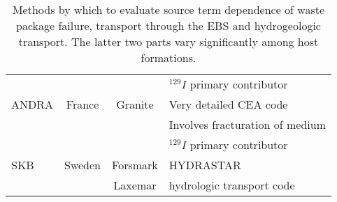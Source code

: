 \begin{table}
{\begin{tabular}{|l|c|c|l|}
                                                        &             &                           & $^{129}I$ primary contributor \\
      ANDRA \cite{andra_granite:_2005}                  & France      & Granite                   &  Very detailed CEA code  \\
                                                        &             &                           &  Involves fracturation of medium \\
                                                        &             &                           & $^{129}I$ primary contributor \\
      SKB \cite{ab_long-term_2006}                      & Sweden      & Forsmark                  &  HYDRASTAR  \\
                                                        &             & Laxemar                   &  hydrologic transport code\\
      \hline
    \end{tabular}
    \caption[Models of Source Term for Various Geologies]{Methods by which to 
    evaluate source term dependence of waste package failure, transport through 
    the \gls{EBS} and hydrogeologic transport. The latter two parts vary significantly among host formations. }
    \label{tab:geosource}
    }
  \end{table}
